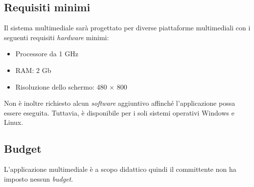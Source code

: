 \subsection{Requisiti minimi}
Il sistema multimediale sarà progettato per diverse piattaforme multimediali con i seguenti requisiti \emph{hardware} minimi:
\begin{itemize}
	\item Processore da 1 GHz
	\item RAM: 2 Gb
	\item Risoluzione dello schermo: 480 $\times$ 800
\end{itemize}
Non è inoltre richiesto alcun \textit{software} aggiuntivo affinché l'applicazione possa essere eseguita. Tuttavia, \ProjectTitle{} è disponibile per i soli sistemi operativi \textsf{Windows} e \textsf{Linux}.

\subsection{Budget}
L'applicazione multimediale è a scopo didattico quindi il committente non ha imposto nessun \emph{budget}.